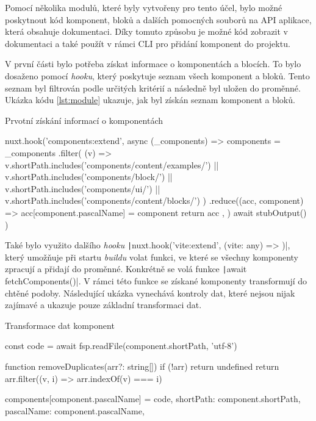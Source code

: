 Pomocí několika modulů, které byly vytvořeny pro tento účel, bylo možné poskytnout kód komponent, bloků a dalších pomocných souborů na API aplikace, která obsahuje dokumentaci. Díky tomuto způsobu je možné kód zobrazit v dokumentaci a také použít v rámci CLI pro přidání komponent do projektu.

V první části bylo potřeba získat informace o komponentách a blocích. To bylo dosaženo pomocí \emph{hooku}, který poskytuje seznam všech komponent a bloků. Tento seznam byl filtrován podle určitých kritérií a následně byl uložen do proměnné. Ukázka kódu \ref{lst:module} ukazuje, jak byl získán seznam komponent a bloků.

\begin{listing}[H]
    \caption{Prvotní získání informací o komponentách}
    \label{lst:module}
    \begin{code}
nuxt.hook('components:extend', async (_components) => {
    components = _components
        .filter(
        (v) =>
            v.shortPath.includes('components/content/examples/') ||
            v.shortPath.includes('components/block/') ||
            v.shortPath.includes('components/ui/') ||
            v.shortPath.includes('components/content/blocks/')
        )
        .reduce((acc, component) => {
        acc[component.pascalName] = component
        return acc
        }, {})
    await stubOutput()
})
\end{code}
\end{listing}

Také bylo využito dalšího \emph{hooku} \texttt|nuxt.hook('vite:extend', (vite: any) => {})|, který umožňuje při startu \emph{buildu} volat funkci, ve které se všechny komponenty zpracují a přidají do proměnné. Konkrétně se volá funkce \texttt|await fetchComponents()|. V rámci této funkce se získané komponenty transformují do chtěné podoby. Následující ukázka vynechává kontroly dat, které nejsou nijak zajímavé a ukazuje pouze základní transformaci dat.

\clearpage

\begin{listing}[H]
    \caption{Transformace dat komponent}
    \label{lst:module}
    \begin{code}
const code = await fsp.readFile(component.shortPath, 'utf-8')

function removeDuplicates(arr?: string[]) {
    if (!arr) {
    return undefined
    }
    return arr.filter((v, i) => arr.indexOf(v) === i)
}

components[component.pascalName] = {
    code,
    shortPath: component.shortPath,
    pascalName: component.pascalName,
}
\end{code}
\end{listing}


